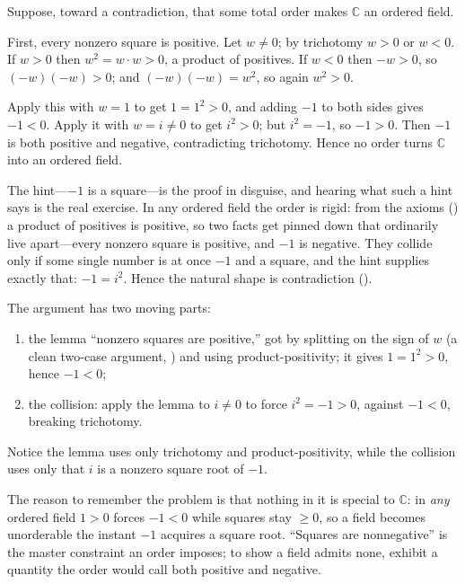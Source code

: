 \documentclass[main.tex]{subfiles}
\begin{document}
\begin{Solution}
Suppose, toward a contradiction, that some total order makes $\mathbb C$ an ordered field.

First, every nonzero square is positive. Let $w\neq 0$; by trichotomy $w>0$ or $w<0$. If $w>0$ then
$w^2=w\cdot w>0$, a product of positives. If $w<0$ then $-w>0$, so $(-w)(-w)>0$; and
$(-w)(-w)=w^2$, so again $w^2>0$.

Apply this with $w=1$ to get $1=1^2>0$, and adding $-1$ to both sides gives $-1<0$. Apply it with
$w=i\neq 0$ to get $i^2>0$; but $i^2=-1$, so $-1>0$. Then $-1$ is both positive and negative,
contradicting trichotomy. Hence no order turns $\mathbb C$ into an ordered field.
\end{Solution}

\begin{Reflection}
The hint---$-1$ is a square---is the proof in disguise, and hearing what such a hint says is the real
exercise. In any ordered field the order is rigid: from the axioms () a product of
positives is positive, so two facts get pinned down that ordinarily live apart---every nonzero square
is positive, and $-1$ is negative. They collide only if some single number is at once $-1$ and a
square, and the hint supplies exactly that: $-1=i^2$. Hence the natural shape is contradiction
().

The argument has two moving parts:
\begin{enumerate}[leftmargin=1.7em,itemsep=3pt,topsep=2pt,label=\textnormal{(\arabic*)}]
  \item the lemma ``nonzero squares are positive,'' got by splitting on the sign of $w$ (a clean
        two-case argument, ) and using product-positivity; it gives $1=1^2>0$, hence
        $-1<0$;
  \item the collision: apply the lemma to $i\neq 0$ to force $i^2=-1>0$, against $-1<0$, breaking
        trichotomy.
\end{enumerate}

Notice the lemma uses only trichotomy and product-positivity, while the collision uses only that $i$
is a nonzero square root of $-1$.

The reason to remember the problem is that nothing in it is special to $\mathbb C$: in \emph{any}
ordered field $1>0$ forces $-1<0$ while squares stay $\ge 0$, so a field becomes unorderable the
instant $-1$ acquires a square root. ``Squares are nonnegative'' is the master constraint an order
imposes; to show a field admits none, exhibit a quantity the order would call both positive and
negative.
\end{Reflection}
\end{document}
